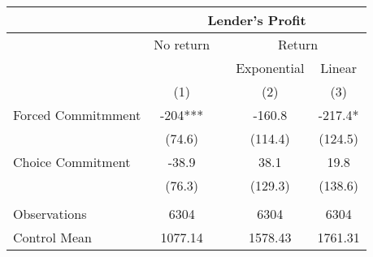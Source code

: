 \begin{tabular}{lcccc}
\toprule
      & \multicolumn{4}{c}{Lender's Profit} \\
\midrule
      & No return &       & \multicolumn{2}{c}{Return} \\
\cmidrule{2-2}\cmidrule{4-5}      &       &       & Exponential & Linear \\
\cmidrule{4-5}      & (1)   &       & (2)   & (3) \\
\midrule
\midrule
Forced Commitmment & -204*** &       & -160.8 & -217.4* \\
      & (74.6) &       & (114.4) & (124.5) \\
Choice Commitment & -38.9 &       & 38.1  & 19.8 \\
      & (76.3) &       & (129.3) & (138.6) \\
      &       &       &       &  \\
\midrule
Observations & 6304  &       & 6304  & 6304 \\
Control Mean & 1077.14 &       & 1578.43 & 1761.31 \\
\bottomrule
\bottomrule
\end{tabular}%
